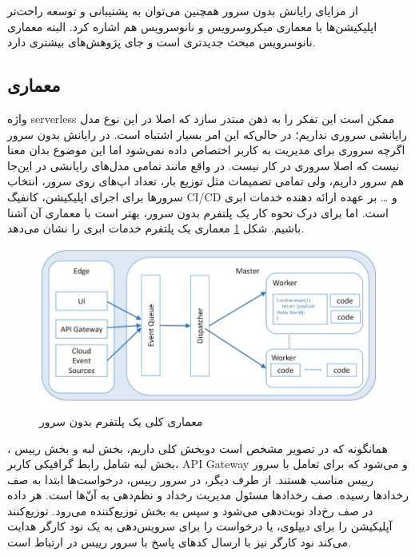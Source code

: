 \par
از مزایای رایانش بدون سرور همچنین می‌توان به پشتیبانی و توسعه راحت‌تر اپلیکیشن‌ها با معماری میکروسرویس و نانوسرویس هم اشاره کرد. البته معماری نانوسرویس مبحث جدیدتری است و جای پژوهش‌های بیشتری دارد.

\subsection{معماری}
\par
واژه serverless ممکن است این تفکر را به ذهن مبتدر سازد که اصلا در این نوع مدل رایانشی سروری نداریم؛ در حالی‌که این امر بسیار اشتباه است. در رایانش بدون سرور اگرچه سروری برای مدیریت به کاربر اختصاص داده نمی‌شود اما این موضوع بدان معنا نیست که اصلا سروری در کار نیست. در واقع مانند تمامی مدل‌های رایانشی در این‌جا هم سرور داریم، ولی تمامی تصمیمات مثل توزیع بار، تعداد اپ‌های روی سرور، انتخاب سرور‌ها برای اجرای اپلیکیشن، کانفیگ CI/CD و … بر عهده ارائه دهنده خدمات ابری است. اما برای درک نحوه کار یک پلتفرم بدون سرور، بهتر است با معماری آن آشنا باشیم. شکل \ref{fig:Serverless-Architecture} معماری یک پلتفرم خدمات ابری را نشان می‌دهد.

\par

\begin{figure}
	\centering
	\includegraphics[width=\linewidth]{figs/Serverless-Architecture}
	\caption {معماری کلی یک پلتفرم بدون سرور}
	\label{fig:Serverless-Architecture}
\end{figure}

\par
همانگونه که در تصویر مشخص است دوبخش کلی داریم، بخش لبه‌ و بخش رییس ، بخش لبه شامل رابط گرافیکی کاربر، API Gateway و  می‌شود که برای تعامل با سرور رییس مناسب هستند. از طرف دیگر، در سرور رییس، درخواست‌ها ابتدا به صف رخداد‌ها رسیده. صف رخداد‌ها مسئول مدیریت رخداد و نظم‌دهی به آن‌ّ‌ها است. هر داده در صف رخ‌داد نوبت‌دهی می‌شود و سپس به بخش توزیع‌کننده می‌رود. توزیع‌کنند آپلیکیشن را برای دیپلوی، یا درخواست را برای سرویس‌دهی به یک نود کارگر هدایت می‌کند نود کارگر نیز با ارسال کدهای پاسخ با سرور رییس در ارتباط است. \cite{baldini2017serverless}

